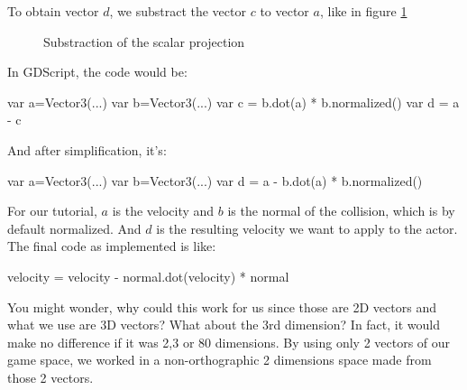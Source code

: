 \documentclass[10pt,a4paper]{article}
\begin{document}
To obtain vector $d$, we substract the vector $c$ to vector $a$, like in figure \ref{fig:scalar_substraction}
\begin{figure}[H]
\centering
{}
\caption{Substraction of the scalar projection}
\label{fig:scalar_substraction}
\end{figure}
In GDScript, the code would be:
\begin{pythoncode}
  var a=Vector3(...)
  var b=Vector3(...)
  var c = b.dot(a) * b.normalized()
  var d = a - c
\end{pythoncode}
And after simplification, it's:
\begin{pythoncode}
  var a=Vector3(...)
  var b=Vector3(...)
  var d = a - b.dot(a) * b.normalized()
\end{pythoncode}

For our tutorial, $a$ is the velocity and $b$ is the normal of the collision, which is by default normalized. And $d$ is the resulting velocity we want to apply to the actor. The final code as implemented is like:
\begin{pythoncode}
  velocity = velocity - normal.dot(velocity) * normal
\end{pythoncode}

You might wonder, why could this work for us since those are 2D vectors and what we use are 3D vectors? What about the 3rd dimension? In fact, it would make no difference if it was 2,3 or 80 dimensions. By using only 2 vectors of our game space, we worked in a non-orthographic 2 dimensions space made from those 2 vectors.
\end{document}

